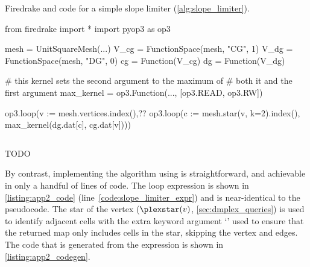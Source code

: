 \documentclass[thesis]{subfiles}
\begin{document}
\begin{listing}
  \centering
  \caption{
    Firedrake and  code for a simple slope limiter (\cref{alg:slope_limiter}).
  }
  \begin{minipage}{.9\textwidth}
    \begin{pyalg2}
      from firedrake import *
      import pyop3 as op3

      mesh = UnitSquareMesh(...)
      V_cg = FunctionSpace(mesh, "CG", 1)
      V_dg = FunctionSpace(mesh, "DG", 0)
      cg = Function(V_cg)
      dg = Function(V_dg)

      # this kernel sets the second argument to the maximum of
      # both it and the first argument
      max_kernel = op3.Function(..., [op3.READ, op3.RW])

      op3.loop(v := mesh.vertices.index(),?\label{code:slope_limiter_expr}?
               op3.loop(c := mesh.star(v, k=2).index(),
                        max_kernel(dg.dat[c], cg.dat[v])))
    \end{pyalg2}
  \end{minipage}
  \label{listing:app2_code}
\end{listing}


\begin{listing}
  \centering
  \begin{minipage}{.9\textwidth}
    \inputminted[linenos]{c}{./experiments/slope_limiter/c_code_tidy.c}
  \end{minipage}
  \caption{TODO}
  \label{listing:app2_codegen}
\end{listing}


By contrast, implementing the algorithm using  is straightforward, and achievable in only a handful of lines of code.
The loop expression is shown in \cref{listing:app2_code} (line~\ref{code:slope_limiter_expr}) and is near-identical to the pseudocode.
The star of the vertex ($\plexstar(v)$, \cref{sec:dmplex_queries}) is used to identify adjacent cells with the extra keyword argument `' used to ensure that the returned map only includes cells in the star, skipping the vertex and edges.
The code that is generated from the expression is shown in \cref{listing:app2_codegen}.
\end{document}
